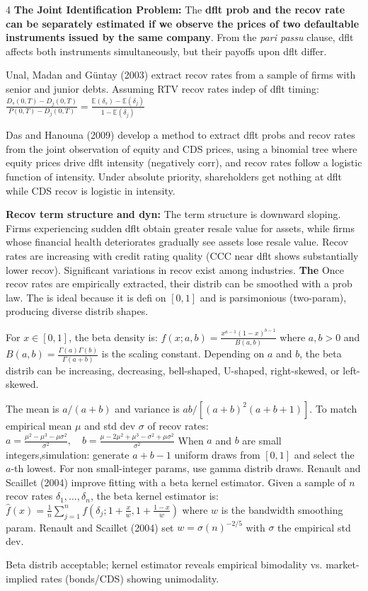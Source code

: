 \documentclass[landscape]{article}
\begin{document}
\begin{multicols}{4}
\textcolor{subsubsectioncolor}{\textbf{The Joint Identification Problem:}} The \textbf{dflt prob and the recov rate can be separately estimated if we observe the prices of two defaultable instruments issued by the same company}. From the \textit{pari passu} clause, dflt affects both instruments simultaneously, but their payoffs upon dflt differ.

Unal, Madan and Güntay (2003) extract recov rates from a sample of firms with senior and junior debts. Assuming RTV recov rates indep of dflt timing: $\frac{D_s(0,T) - D_j(0,T)}{P(0,T) - D_j(0,T)} = \frac{\mathbb{E}(\delta_s) - \mathbb{E}(\delta_j)}{1 - \mathbb{E}(\delta_j)}$

Das and Hanouna (2009) develop a method to extract dflt probs and recov rates from the joint observation of equity and CDS prices, using a binomial tree where equity prices drive dflt intensity (negatively corr), and recov rates follow a logistic function of intensity. Under absolute priority, shareholders get nothing at dflt while CDS recov is logistic in intensity.

\textbf{Recov term structure and dyn:} The term structure is downward sloping. Firms experiencing sudden dflt obtain greater resale value for assets, while firms whose financial health deteriorates gradually see assets lose resale value. Recov rates are increasing with credit rating quality (CCC near dflt shows substantially lower recov). Significant variations in recov exist among industries.
\textcolor{subsubsectioncolor}{\textbf{The }} Once recov rates are empirically extracted, their distrib can be smoothed with a prob law. The  is ideal because it is defi on $[0,1]$ and is parsimonious (two-param), producing diverse distrib shapes.

For $x \in [0,1]$, the beta density is: $f(x;a,b) = \frac{x^{a-1}(1-x)^{b-1}}{B(a,b)}$ where $a, b > 0$ and $B(a,b) = \frac{\Gamma(a)\Gamma(b)}{\Gamma(a+b)}$ is the scaling constant. Depending on $a$ and $b$, the beta distrib can be increasing, decreasing, bell-shaped, U-shaped, right-skewed, or left-skewed.

The mean is $a/(a+b)$ and variance is $ab/[(a+b)^2(a+b+1)]$. To match empirical mean $\mu$ and std dev $\sigma$ of recov rates: $a = \frac{\mu^2 - \mu^3 - \mu\sigma^2}{\sigma^2}, \quad b = \frac{\mu - 2\mu^2 + \mu^3 - \sigma^2 + \mu\sigma^2}{\sigma^2}$
When $a$ and $b$ are small integers,simulation: generate $a+b-1$ uniform draws from $[0,1]$ and select the $a$-th lowest. For non small-integer params, use gamma distrib draws.
Renault and Scaillet (2004) improve fitting with a beta kernel estimator. Given a sample of $n$ recov rates $\delta_1, \ldots, \delta_n$, the beta kernel estimator is: $\hat{f}(x) = \frac{1}{n}\sum_{j=1}^n f\left(\delta_j; 1 + \frac{x}{w}, 1 + \frac{1-x}{w}\right)$
where $w$ is the bandwidth smoothing param. Renault and Scaillet (2004) set $w = \sigma(n)^{-2/5}$ with $\sigma$ the empirical std dev.

Beta distrib acceptable; kernel estimator reveals empirical bimodality vs. market-implied rates (bonds/CDS) showing unimodality.

\end{multicols}
\end{document}
